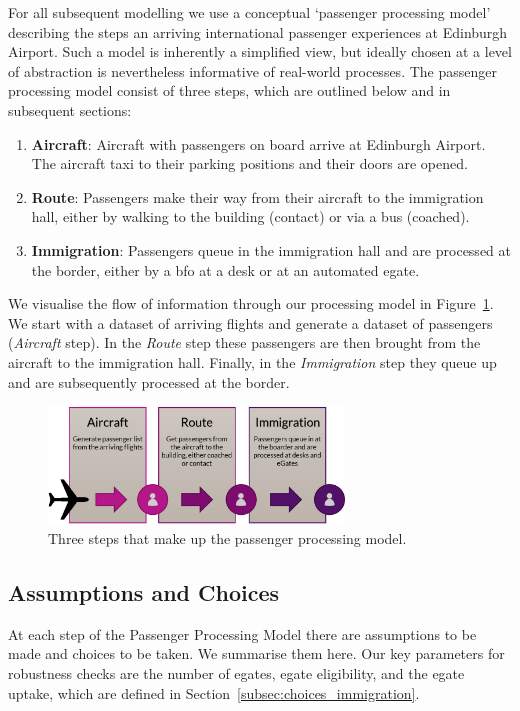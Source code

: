 \documentclass[10pt]{article}
\begin{document}
    For all subsequent modelling we use a conceptual `passenger processing model' describing the steps an arriving international passenger experiences at Edinburgh Airport. Such a model is inherently a simplified view, but ideally chosen at a level of abstraction is nevertheless informative of real-world processes. The passenger processing model consist of three steps, which are outlined below and in subsequent sections:
\begin{enumerate}
    \item \textbf{Aircraft}: Aircraft with passengers on board arrive at Edinburgh Airport. The aircraft taxi to their parking positions and their doors are opened. \label{step:aircraft}
    \item \textbf{Route}: Passengers make their way from their aircraft to the immigration hall, either by walking to the building (contact) or via a bus (coached). \label{step:route}
    \item \textbf{Immigration}: Passengers queue in the immigration hall and are processed at the border, either by a \gls{bfo} at a desk or at an automated \gls{egate}. \label{step:immigration}
\end{enumerate}
 We visualise the flow of information through our processing model in Figure~\ref{fig:PPM_threesteps}. We start with a dataset of arriving flights and generate a dataset of passengers (\textit{Aircraft} step). In the \textit{Route} step these passengers are then brought from the aircraft to the immigration hall. Finally, in the \textit{Immigration} step they queue up and are subsequently processed at the border.

\begin{figure}[!ht]
    \centering
    \includegraphics[width=0.7\textwidth]{figures/ThreeSteps.png}
     \caption{Three steps that make up the passenger processing model.  } \label{fig:PPM_threesteps}
\end{figure}

\subsection{Assumptions and Choices}
At each step of the Passenger Processing Model there are assumptions to be made and choices to be taken. We summarise them here. Our key parameters for robustness checks are the number of \glspl{egate}, \gls{egate} eligibility, and the \gls{egate} uptake, which are defined in Section~\ref{subsec:choices_immigration}.
\end{document}
